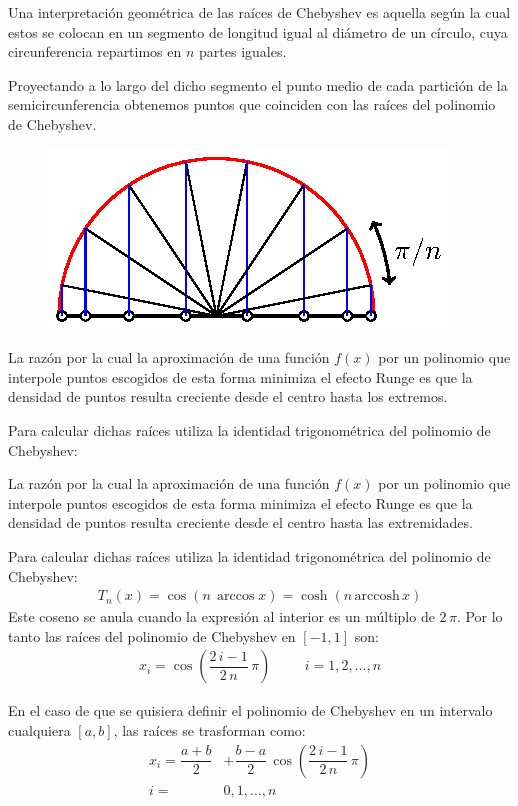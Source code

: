 \documentclass[12pt]{article}
\numberwithin{equation}{section}
\begin{document}
Una interpretación geométrica de las raíces de Chebyshev es aquella según la cual estos se colocan en un segmento de longitud igual al diámetro de un círculo, cuya circunferencia repartimos en $n$ partes iguales.
\par
Proyectando a lo largo del dicho segmento el punto medio de cada partición de la semicircunferencia obtenemos puntos que coinciden con las raíces del polinomio de Chebyshev.
\begin{figure}[H]
    \centering
    \includegraphics[scale=1]{Imagenes/Nodos_Chebychev_01.eps}
\end{figure}

La razón por la cual la aproximación de una función $f(x)$ por un polinomio que interpole puntos escogidos de esta forma minimiza el efecto Runge es que la densidad de puntos resulta creciente desde el centro hasta los extremos.
\par
Para calcular dichas raíces utiliza la identidad trigonométrica del polinomio de Chebyshev:

La razón por la cual la aproximación de una función $f(x)$ por un polinomio que interpole puntos escogidos de esta forma minimiza el efecto Runge es que la densidad de puntos resulta creciente desde el centro hasta las extremidades.
\par
Para calcular dichas raíces utiliza la identidad trigonométrica del polinomio de Chebyshev:
\begin{align*}
T_{n}(x) = \cos (n \, \arccos x) = \cosh (n \, \mbox{arccosh} \, x)
\end{align*}
Este coseno se anula cuando la expresión al interior es un múltiplo de $2 \, \pi$.  Por lo tanto las raíces del polinomio de Chebyshev en $[-1,1]$ son:
\begin{align*}
x_{i} = \cos \left( \dfrac{2 \, i - 1}{2 \, n} \, \pi \right) \hspace{1cm} i = 1, 2, \ldots, n
\end{align*}

En el caso de que se quisiera definir el polinomio de Chebyshev en un intervalo cualquiera $[a, b]$, las raíces se trasforman como:
\begin{align*}
x_{i} = \dfrac{a + b}{2} &+ \dfrac{b - a}{2} \, \cos \left( \dfrac{2 \, i - 1}{2 \, n} \, \pi \right) \\[0.5em] 
i =& 0, 1, \ldots, n
\end{align*}
\end{document}
